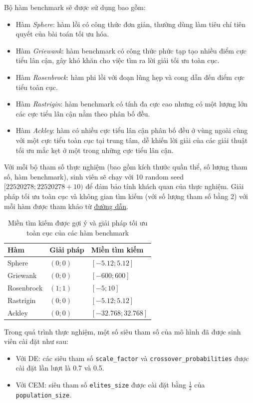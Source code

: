 \documentclass[10pt]{report}
\begin{document}
Bộ hàm benchmark sẽ được sử dụng bao gồm:
\begin{itemize}
	\item Hàm \emph{Sphere}: hàm lồi có công thức đơn giản, thường dùng làm tiêu chí tiên quyết của bài toán tối ưu hóa.
	\item Hàm \emph{Griewank}: hàm benchmark có công thức phức tạp tạo nhiều điểm cực tiểu lân cận, gây khó khăn cho việc tìm ra lời giải tối ưu toàn cục.
	\item Hàm \emph{Rosenbrock}: hàm phi lồi với đoạn lũng hẹp và cong dẫn đến điểm cực tiểu toàn cục.
	\item Hàm \emph{Rastrigin}: hàm benchmark có tính đa cực cao nhưng có một lượng lớn các cực tiểu lân cận nằm theo phân bố đều.
	\item Hàm \emph{Ackley}: hàm có nhiều cực tiểu lân cận phân bố đều ở vùng ngoài cùng với một cực tiểu toàn cục tại trung tâm, dễ khiến lời giải của các giải thuật tối ưu mắc kẹt ở một trong những cực tiểu lân cận.
\end{itemize}

Với mỗi bộ tham số thực nghiệm (bao gồm kích thước quần thể, số lượng tham số, hàm benchmark), sinh viên sẽ chạy với 10 random seed \([22520278; 22520278 + 10)\) để đảm bảo tính khách quan của thực nghiệm. Giải pháp tối ưu toàn cục và không gian tìm kiếm (với số lượng tham số bằng 2) với mỗi hàm được tham khảo từ \href{https://www.sfu.ca/~ssurjano/optimization.html}{đường dẫn}.

\begin{table}[H]\centering
	\caption{Miền tìm kiếm được gợi ý và giải pháp tối ưu toàn cục của các hàm benchmark}
	\begin{tabularx}{0.6\textwidth}{XXX}
		\toprule
		\textbf{Hàm} & \textbf{Giải pháp} & \textbf{Miền tìm kiếm} \\
		\midrule
		Sphere       & \((0; 0)\)         & \([-5.12; 5.12]\)      \\
		Griewank     & \((0; 0)\)         & \([-600; 600]\)        \\
		Rosenbrock   & \((1; 1)\)         & \([-5; 10]\)           \\
		Rastrigin    & \((0; 0)\)         & \([-5.12; 5.12]\)      \\
		Ackley       & \((0; 0)\)         & \([-32.768; 32.768]\)  \\
		\bottomrule
	\end{tabularx}
\end{table}

Trong quá trình thực nghiệm, một số siêu tham số của mô hình đã được sinh viên cài đặt như sau:
\begin{itemize}
	\item Với DE: các siêu tham số \texttt{scale\_factor} và \texttt{crossover\_probabilities} được cài đặt lần lượt là 0.7 và 0.5.
	\item Với CEM: siêu tham số \texttt{elites\_size} được cài đặt bằng \(\frac{1}{2}\) của \texttt{population\_size}.
\end{itemize}
\end{document}
